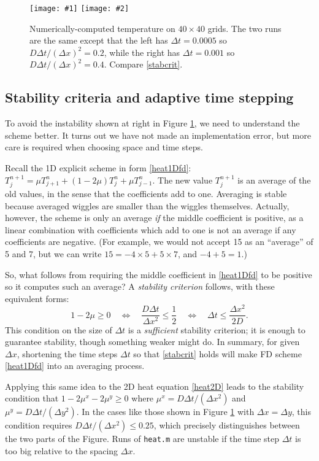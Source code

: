 \documentclass[letterpaper,final,12pt,reqno]{amsart}
\newcommand{\twofigsizes}[5]{
\begin{figure}[ht]
\centering
\texttt{[image: \#1]} \quad
\texttt{[image: \#2]}
\caption{#3}
\label{fig:#1}
\end{figure}}
\newcommand{\twofig}[3]{\twofigsizes{#1}{#2}{#3}{2.5in}{2.5in}}
\begin{document}
\twofig{stability}{instability}{Numerically-computed temperature on $40\times 40$ grids.  The two runs are the same except that the left has $\Delta t=0.0005$ so $D\Delta t/(\Delta x)^2= 0.2$, while the right has $\Delta t=0.001$ so $D\Delta t/(\Delta x)^2= 0.4$.  Compare \eqref{stabcrit}.}


\subsection*{Stability criteria and adaptive time stepping}  To avoid the instability shown at right in Figure \ref{fig:stability}, we need to understand the scheme better.  It turns out we have not made an implementation error, but more care is required when choosing space and time steps.

Recall the 1D explicit scheme in form \eqref{heat1Dfd}: $T_j^{n+1} = \mu T_{j+1}^n + (1 - 2 \mu) T_j^n + \mu T_{j-1}^n$.  The new value $T_j^{n+1}$ is an average of the old values, in the sense that the coefficients add to one.  Averaging is stable because averaged wiggles are smaller than the wiggles themselves.  Actually, however, the scheme is only an average \emph{if} the middle coefficient is positive, as a linear combination with coefficients which add to one is not an average if any coefficients are negative.  (For example, we would not accept 15 as an ``average'' of 5 and 7, but we can write $15 = -4 \times 5 + 5 \times 7$, and $-4+5=1$.)

So, what follows from requiring the middle coefficient in \eqref{heat1Dfd} to be positive so it computes such an average?  A \emph{stability criterion} follows, with these equivalent forms:
\begin{equation}
   1 - 2 \mu \ge 0 \quad \iff \quad \frac{D\Delta t}{\Delta x^2} \le \frac{1}{2} \quad \iff \quad \Delta t \le \frac{\Delta x^2}{2 D}.  \label{stabcrit}
\end{equation}
This condition on the size of $\Delta t$ is a \emph{sufficient} stability criterion; it is enough to guarantee stability, though something weaker might do.  In summary, for given $\Delta x$, shortening the time steps $\Delta t$ so that \eqref{stabcrit} holds will make FD scheme \eqref{heat1Dfd} into an averaging process.

Applying this same idea to the 2D heat equation \eqref{heat2D} leads to the stability condition that $1-2\mu^x-2\mu^y \ge 0$ where $\mu^x = D \Delta t / (\Delta x^2)$ and $\mu^y = D \Delta t / (\Delta y^2)$.  In the cases like those shown in Figure \ref{fig:stability} with $\Delta x=\Delta y$, this condition requires $D \Delta t /(\Delta x^2) \le 0.25$, which precisely distinguishes between the two parts of the Figure.  Runs of \texttt{heat.m} are unstable if the time step $\Delta t$ is too big relative to the spacing $\Delta x$.
\end{document}
